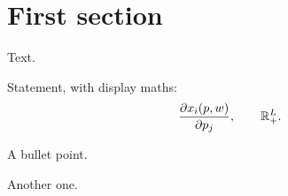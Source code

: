 \documentclass[11pt]{article}
\begin{document}


\section{First section}

Text.

Statement, with display maths:
\[ \frac{\partial x_i(p,w)}{\partial p_j}, \qquad \mathbb{R}^L_+. \]

\begin{flatlist}
  \item A bullet point.
  \item Another one.
\end{flatlist}
\end{document}
